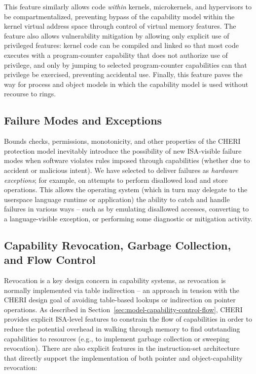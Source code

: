 This feature similarly allows code \emph{within} kernels, microkernels, and
hypervisors to be compartmentalized, preventing bypass of the capability model
within the kernel virtual address space through control of virtual memory
features.
The feature also allows vulnerability mitigation by allowing only explicit
use of privileged features: kernel code can be compiled and linked so that
most code executes with a program-counter capability that does not authorize
use of privilege, and only by jumping to selected program-counter capabilities
can that privilege be exercised, preventing accidental use.
Finally, this feature paves the way for process and object models in which the
capability model is used without recourse to rings.

\subsection{Failure Modes and Exceptions}
\label{sec:failuremodesandexceptions}

Bounds checks, permissions, monotonicity, and other properties of the CHERI
protection model inevitably introduce the possibility of new ISA-visible
failure modes when software violates rules imposed through capabilities
(whether due to accident or malicious intent).
We have selected to deliver failures as \textit{hardware exceptions}; for
example, on attempts to perform disallowed load and store operations.
This allows the operating system (which in turn may delegate to the userspace
language runtime or application) the ability to catch and handle failures in
various ways -- such as by emulating disallowed accesses, converting to a
language-visible exception, or performing some diagnostic or mitigation
activity.

\subsection{Capability Revocation, Garbage Collection, and Flow Control}
\label{sec:model-capability-revocation}

Revocation is a key design concern in capability systems, as revocation is
normally implemented via table indirection -- an approach in tension with the
CHERI design goal of avoiding table-based lookups or indirection on pointer
operations.
As described in Section~\ref{sec:model-capability-control-flow}, CHERI provides
explicit ISA-level features to constrain the flow of capabilities in order to
reduce the potential overhead in walking through memory to find outstanding
capabilities to resources (e.g., to implement garbage collection or sweeping
revocation).
There are also explicit features in the instruction-set architecture that
directly support the implementation of both pointer and object-capability
revocation:

